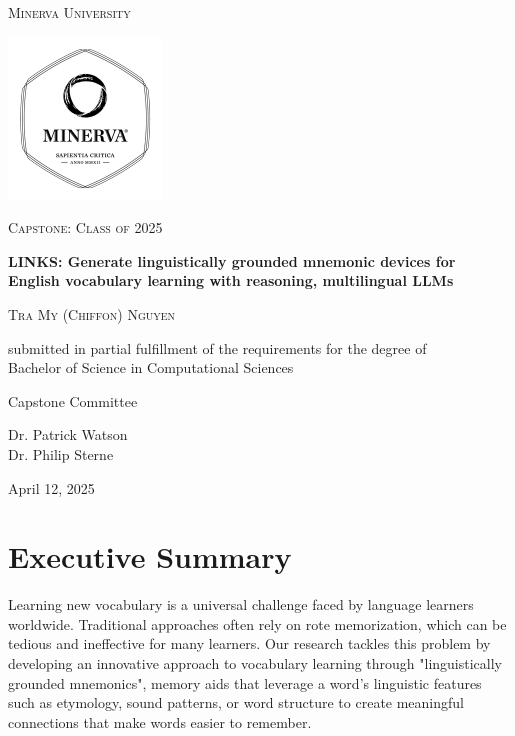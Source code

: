\begin{titlepage}
\centering
{\scshape\LARGE Minerva University \par}
\vspace{1cm}
\begin{center}
  \includegraphics[width=0.4\linewidth]{minerva/minerva_logo.pdf}
\end{center}
{\scshape\Large Capstone: Class of 2025 \par}
\vspace{1.5cm}
{\huge\bfseries LINKS: Generate linguistically grounded mnemonic devices for English vocabulary learning with reasoning, multilingual LLMs \par}
\vspace{2cm}
{\scshape\large Tra My (Chiffon) Nguyen \par}

\vfill
submitted in partial fulfillment of the requirements for the degree of \\ Bachelor of Science in Computational Sciences \par
\vspace{2cm}
{\large Capstone Committee \par}
Dr. Patrick Watson \\
Dr. Philip Sterne \\
\vspace{2cm}
{\large April 12, 2025 \par}
\end{titlepage}

\onecolumn
\section*{Executive Summary} \label{sec:exec-summary}

Learning new vocabulary is a universal challenge faced by language learners worldwide. Traditional approaches often rely on rote memorization, which can be tedious and ineffective for many learners. Our research tackles this problem by developing an innovative approach to vocabulary learning through "linguistically grounded mnemonics", memory aids that leverage a word's linguistic features such as etymology, sound patterns, or word structure to create meaningful connections that make words easier to remember.

